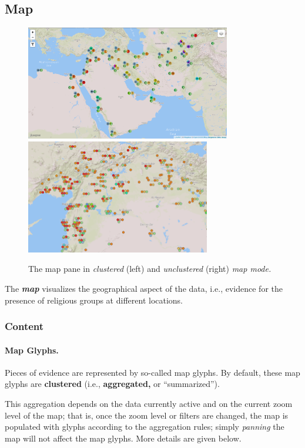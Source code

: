 \subsection{Map}
\label{sec:map}

\begin{figure}[tb]
  \centering
  \includegraphics[height=5cm]{../src/assets/visualization-documentation/map-1.png}%
  \hfill%
  \includegraphics[height=5cm]{../src/assets/visualization-documentation/map-2.png}
  \caption{
    The map pane in \emph{clustered} (left) and \emph{unclustered} (right) \emph{map mode.}
  }
\end{figure}

The \textbf{\emph{map}} visualizes the geographical aspect of the data, i.e., evidence for the presence of religious groups at different locations.


\subsubsection{Content}

\paragraph{Map Glyphs.}
Pieces of evidence are represented by so-called map glyphs.
By default, these map glyphs are \textbf{clustered} (i.e., \textbf{aggregated,} or \enquote{summarized}).

This aggregation depends on the data currently active and on the current zoom level of the map;
that is, once the zoom level or filters are changed, the map is populated with glyphs according to the aggregation rules;
simply \emph{panning} the map will not affect the map glyphs.
More details are given below.

